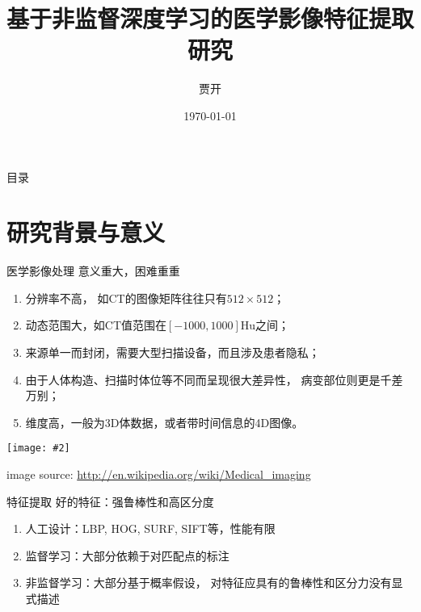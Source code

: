\documentclass {beamer}
\title{基于非监督深度学习的医学影像特征提取研究}
\author {贾开}
\institute {清华大学}
\date{\today}
\newcommand{\addgraph}[2]{\begin{center}
\texttt{[image: \#2]}\end{center}}
\begin{document}



\begin{frame}{目录}
    \tableofcontents
\end{frame}

\section{研究背景与意义}

\begin{frame}{医学影像处理}
    意义重大，困难重重
    \begin{enumerate}
        \item 分辨率不高，
            如CT的图像矩阵往往只有$512\times 512$；
        \item 动态范围大，如CT值范围在$[-1000,1000]$Hu之间；
        \item 来源单一而封闭，需要大型扫描设备，而且涉及患者隐私；
        \item 由于人体构造、扫描时体位等不同而呈现很大差异性，
            病变部位则更是千差万别；
        \item 维度高，一般为3D体数据，或者带时间信息的4D图像。
    \end{enumerate}
    \addgraph{0.3}{res/mi-concept.jpg}
    \tiny{image source:
        \url{http://en.wikipedia.org/wiki/Medical\_imaging}}
\end{frame}

\begin{frame}{特征提取}
    好的特征：强\alert{鲁棒性}和高\alert{区分度}
    \begin{enumerate}
        \item 人工设计：LBP, HOG, SURF, SIFT等，性能有限
        \item 监督学习：大部分依赖于对匹配点的标注
        \item 非监督学习：大部分基于概率假设，
            对特征应具有的鲁棒性和区分力没有显式描述
    \end{enumerate}
\end{frame}
\end{document}
